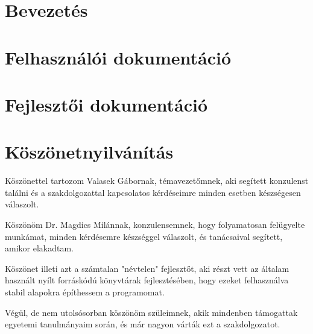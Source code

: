 \documentclass[12pt,oneside]{report}
\begin{document}


\tableofcontents

\chapter{Bevezetés}


\chapter{Felhasználói dokumentáció}


\chapter{Fejlesztői dokumentáció}


\chapter*{Köszönetnyilvánítás}

Köszönettel tartozom Valasek Gábornak, témavezetőmnek, aki segített konzulenst találni és a szakdolgozattal kapcsolatos kérdéseimre minden esetben készségesen válaszolt.

Köszönöm Dr. Magdics Milánnak, konzulensemnek, hogy folyamatosan felügyelte munkámat, minden kérdésemre készséggel válaszolt, és tanácsaival segített, amikor elakadtam.

Köszönet illeti azt a számtalan "névtelen" fejlesztőt, aki részt vett az általam használt nyílt forráskódú könyvtárak fejlesztésében, hogy ezeket felhasználva stabil alapokra építhessem a programomat.

Végül, de nem utolsósorban köszönöm szüleimnek, akik mindenben támogattak egyetemi tanulmányaim során, és már nagyon várták ezt a szakdolgozatot.
\end{document}
